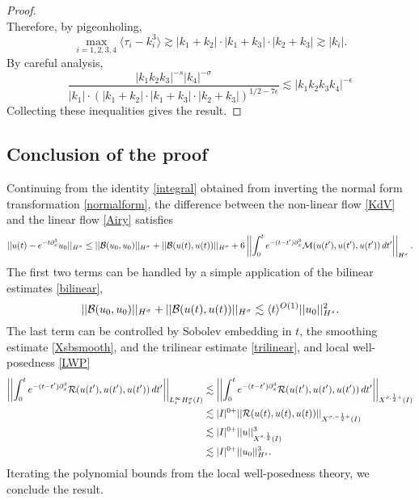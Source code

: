 \begin{proof}
\begin{equation}
        \end{equation}
    Therefore, by pigeonholing, 
        \begin{equation}
            \max_{i = 1, 2, 3, 4} \langle \tau_i - k_i^3 \rangle \gtrsim |k_1 + k_2| \cdot |k_1 + k_3| \cdot |k_2 + k_3| \gtrsim |k_i|.
        \end{equation}
    By careful analysis,     
        \[
            \frac{|k_1 k_2 k_3|^{-s} |k_4|^{-\sigma} }{|k_1| \cdot (|k_1 + k_2| \cdot |k_1 + k_3| \cdot |k_2 + k_3|)^{1/2 - 7\epsilon}} 
                \lesssim |k_1 k_2 k_3 k_4|^{-\epsilon}
        \]
    Collecting these inequalities gives the result. 
   \end{proof}






\subsection{Conclusion of the proof}

Continuing from the identity \eqref{integral} obtained from inverting the normal form transformation \eqref{normalform}, the difference between the non-linear flow \eqref{KdV} and the linear flow \eqref{Airy} satisfies 
    \[
        ||u(t) - e^{- t \partial_x^3} u_0||_{H^\sigma}
            \leq || \mathcal B(u_0, u_0)||_{H^\sigma} + ||\mathcal B(u(t), u(t))||_{H^\sigma} + 6 \left|\left| \int_0^t e^{-(t - t') \partial_x^3} \mathcal M(u(t'), u(t'), u(t')) \, dt' \right|\right|_{H^\sigma}. 
    \]
The first two terms can be handled by a simple application of the bilinear estimates \eqref{bilinear}, 
    \[
        || \mathcal B(u_0, u_0)||_{H^\sigma} + ||\mathcal B(u(t), u(t))||_{H^\sigma}
            \lesssim \langle t \rangle^{O(1)} ||u_0||_{H^s}^2. 
    \]
The last term can be controlled by Sobolev embedding in $t$, the smoothing estimate \eqref{Xsbsmooth}, and the trilinear estimate \eqref{trilinear}, and local well-posedness \eqref{LWP}
    \begin{align*}
        \left|\left| \int_0^t e^{-(t - t') \partial_x^3} \mathcal R(u(t'), u(t'), u(t')) \, dt' \right|\right|_{L^\infty_t H^\sigma_x (I)}
            &\lesssim  \left|\left| \int_0^t e^{-(t - t') \partial_x^3} \mathcal R(u(t'), u(t'), u(t')) \, dt' \right|\right|_{X^{\sigma, \frac12+} (I)}\\
            &\lesssim |I|^{0+} ||\mathcal R(u(t), u(t), u(t))||_{X^{\sigma, -\frac12+} (I)} \\
            &\lesssim  |I|^{0+} ||u||_{X^{s, \frac12} (I)}^3\\
            &\lesssim |I|^{0+} ||u_0||_{H^s}^3.
    \end{align*}
Iterating the polynomial bounds from the local well-posedness theory, we conclude the result. 
